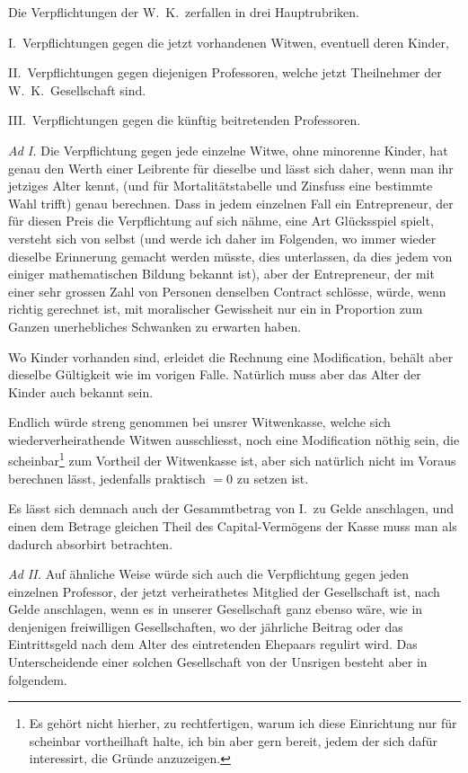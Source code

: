 \documentclass[12pt,a4paper]{article}
\begin{document}
Die Verpflichtungen der W.\ K.\ zerfallen in drei Hauptrubriken.

I.\ Verpflichtungen gegen die jetzt vorhandenen Witwen, eventuell deren Kinder,

II.\ Verpflichtungen gegen diejenigen Professoren, welche jetzt Theilnehmer der W.\ K.\ Gesellschaft sind.

III.\ Verpflichtungen gegen die k\"unftig beitretenden Professoren.

\textit{Ad I.} Die Verpflichtung gegen jede einzelne Witwe, ohne minorenne Kinder, hat genau den Werth einer Leibrente f\"ur dieselbe und l\"asst sich daher, wenn man ihr jetziges Alter kennt, (und f\"ur Mortalit\"atstabelle und Zinsfuss eine bestimmte Wahl trifft) genau berechnen. Dass in jedem einzelnen Fall ein Entrepreneur, der f\"ur diesen Preis die Verpflichtung auf sich n\"ahme, eine Art Gl\"ucksspiel spielt, versteht sich von selbst (und werde ich daher im Folgenden, wo immer wieder dieselbe Erinnerung gemacht werden m\"usste, dies unterlassen, da dies jedem von einiger mathematischen Bildung bekannt ist), aber der Entrepreneur, der mit einer sehr grossen Zahl von Personen denselben Contract schl\"osse, w\"urde, wenn richtig gerechnet ist, mit moralischer Gewissheit nur ein in Proportion zum Ganzen unerhebliches Schwanken zu erwarten haben.

Wo Kinder vorhanden sind, erleidet die Rechnung eine Modification, beh\"alt aber dieselbe G\"ultigkeit wie im vorigen Falle. Nat\"urlich muss aber das Alter der Kinder auch bekannt sein.

Endlich w\"urde streng genommen bei unsrer Witwenkasse, welche sich wiederverheirathende Witwen ausschliesst, noch eine Modification n\"othig sein, die scheinbar\footnote{Es geh\"ort nicht hierher, zu rechtfertigen, warum ich diese Einrichtung nur f\"ur scheinbar vortheilhaft halte, ich bin aber gern bereit, jedem der sich daf\"ur interessirt, die Gr\"unde anzuzeigen.} zum Vortheil der Witwenkasse ist, aber sich nat\"urlich nicht im Voraus berechnen l\"asst, jedenfalls praktisch $= 0$ zu setzen ist.

Es l\"asst sich demnach auch der Gesammtbetrag von I.\ zu Gelde anschlagen, und einen dem Betrage gleichen Theil des Capital-Verm\"ogens der Kasse muss man als dadurch absorbirt betrachten.

\textit{Ad II.} Auf \"ahnliche Weise w\"urde sich auch die Verpflichtung gegen jeden einzelnen Professor, der jetzt verheirathetes Mitglied der Gesellschaft ist, nach Gelde anschlagen, wenn es in unserer Gesellschaft ganz ebenso w\"are, wie in denjenigen freiwilligen Gesellschaften, wo der j\"ahrliche Beitrag oder das Eintrittsgeld nach dem Alter des eintretenden Ehepaars regulirt wird. Das Unterscheidende einer solchen Gesellschaft von der Unsrigen besteht aber in folgendem.
\end{document}
